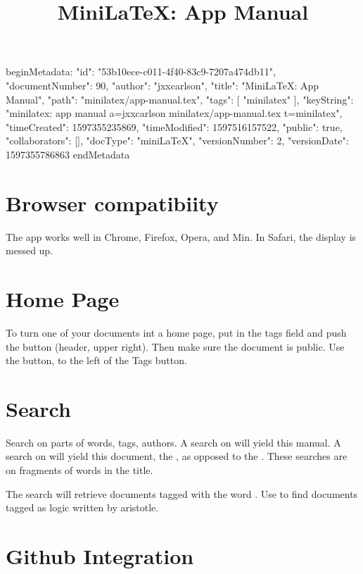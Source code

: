 beginMetadata:
{
    "id": "53b10ece-c011-4f40-83c9-7207a474db11",
    "documentNumber": 90,
    "author": "jxxcarlson",
    "title": "MiniLaTeX: App Manual",
    "path": "minilatex/app-manual.tex",
    "tags": [
        "minilatex"
    ],
    "keyString": "minilatex: app manual a=jxxcarlson minilatex/app-manual.tex t=minilatex",
    "timeCreated": 1597355235869,
    "timeModified": 1597516157522,
    "public": true,
    "collaborators": [],
    "docType": "miniLaTeX",
    "versionNumber": 2,
    "versionDate": 1597355786863
}
endMetadata

\title{MiniLaTeX: App Manual}

\maketitle

\tableofcontents


\section{Browser compatibiity}

The app works well in Chrome, Firefox, Opera, and Min.   In Safari, the display is messed up.


\section{Home Page}

To turn one of your documents int a home page, put  in the tags field and push the button  (header, upper right).  Then make sure the document is public.  Use the  button, to the left of the Tags button.

\section{Search}

Search on parts of words, tags, authors.  A search on  will yield this manual.  A search on  will yield this document, the , as opposed to the .  These searches are on fragments of words in the title.  

The search  will retrieve documents tagged with the word .  Use  to find documents tagged as logic written by aristotle.

\section{Github Integration}

